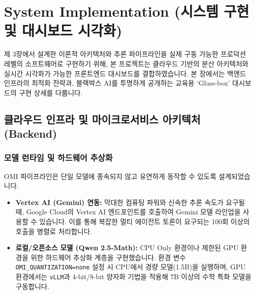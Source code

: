 \section{System Implementation (시스템 구현 및 대시보드 시각화)}

제 3장에서 설계한 이론적 아키텍처와 추론 파이프라인을 실제 구동 가능한 프로덕션 레벨의 소프트웨어로 구현하기 위해, 본 프로젝트는 클라우드 기반의 분산 아키텍처와 실시간 시각화가 가능한 프론트엔드 대시보드를 결합하였습니다. 본 장에서는 백엔드 인프라의 최적화 전략과, 블랙박스 AI를 투명하게 공개하는 교육용 `Glass-box' 대시보드의 구현 상세를 다룹니다.

\subsection{클라우드 인프라 및 마이크로서비스 아키텍처 (Backend)}

\subsubsection{모델 런타임 및 하드웨어 추상화}
OMI 파이프라인은 단일 모델에 종속되지 않고 유연하게 동작할 수 있도록 설계되었습니다. 
\begin{itemize}
    \item \textbf{Vertex AI (Gemini) 연동:} 막대한 컴퓨팅 파워와 신속한 추론 속도가 요구될 때, Google Cloud의 Vertex AI 엔드포인트를 호출하여 Gemini 모델 라인업을 사용할 수 있습니다. 이를 통해 복잡한 멀티 에이전트 토론이 요구되는 100회 이상의 호출을 병렬로 처리합니다.
    \item \textbf{로컬/오픈소스 모델 (Qwen 2.5-Math):} CPU Only 환경이나 제한된 GPU 환경을 위한 하드웨어 추상화 계층을 구현했습니다. 환경 변수 \texttt{OMI\_QUANTIZATION=none} 설정 시 CPU에서 경량 모델(1.5B)을 실행하며, GPU 환경에서는 \texttt{vLLM}과 4-bit/8-bit 양자화 기법을 적용해 7B 이상의 수학 특화 모델을 구동합니다.
\end{itemize}

